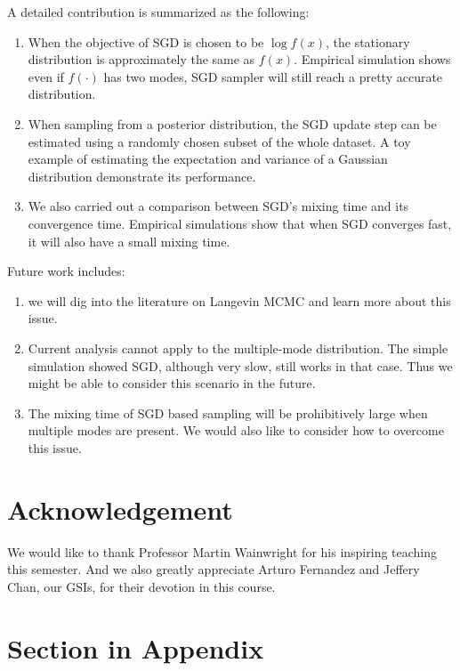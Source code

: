 \documentclass[preprint,12pt,3p]{elsarticle}
\begin{document}
A detailed contribution is summarized as the following:
\begin{enumerate}
    \item When the objective of SGD is chosen to be $\log f(x)$, the stationary distribution is approximately the same as $f(x)$. Empirical simulation shows even if $f(\cdot)$ has two modes, SGD sampler will still reach a pretty accurate distribution.
    \item When sampling from a posterior distribution, the SGD update step can be estimated using a randomly chosen subset of the whole dataset. A toy example of estimating the expectation and variance of a Gaussian distribution demonstrate its performance.
    \item We also carried out a comparison between SGD's mixing time and its convergence time. Empirical simulations show that when SGD converges fast, it will also have a small mixing time.
\end{enumerate}
Future work includes:
\begin{enumerate}
    \item we will dig into the literature on Langevin MCMC and learn more about this issue. 
    \item Current analysis cannot apply to the multiple-mode distribution. The simple simulation showed SGD, although very slow, still works in that case. Thus we might be able to consider this scenario in the future.
    \item The mixing time of SGD based sampling will be prohibitively large when multiple modes are present. We would also like to consider how to overcome this issue.
\end{enumerate}

\section{Acknowledgement}

We would like to thank Professor Martin Wainwright for his inspiring teaching this semester. And we also greatly appreciate Arturo Fernandez and Jeffery Chan, our GSIs, for their devotion in this course.

\newpage
\appendix

\section{Section in Appendix}
\label{appendix-sec1}
\end{document}
